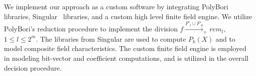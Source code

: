 We implement our approach as a custom software by integrating PolyBori~\cite{pbori:JSC09} libraries,
{\sc Singular}~\cite{DGPS_410} libraries, and a custom high level finite field engine.
We utilize PolyBori’s reduction procedure to implement the division 
$f\xrightarrow{F'_l\cup F'_{0}}_+ rem_l,$ $ 1 \leq l \leq 2^m$. The libraries from {\sc Singular} 
are used to compute $P_k(X)$ and to model composite field characteristics.
The custom finite field engine is employed in modeling bit-vector and coefficient computations,
and is utilized in the overall decision procedure.

